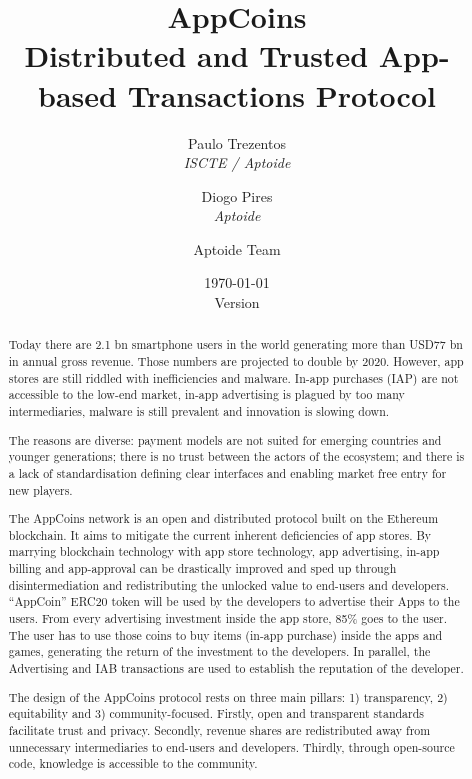 \documentclass[12pt, a4paper, titlepage]{article}
\title{AppCoins\\ Distributed and Trusted App-based Transactions Protocol}
\author{\small Paulo Trezentos  \\
  {\em  ISCTE / Aptoide}  \\
  \and 
\small  Diogo Pires \\
  {\em Aptoide} \\
  \and
  Aptoide Team
  }
\date{\today\\\normalsize Version \versionnumber}
\begin{document}
\maketitle


\begin{abstract}

Today there are 2.1 bn smartphone users in the world generating more than USD77 bn in annual gross revenue. Those numbers are projected to double by 2020. However, app stores are still riddled with inefficiencies and malware. In-app purchases (IAP) are not accessible to the low-end market, in-app advertising is plagued by too many intermediaries, malware is still prevalent and innovation is slowing down.

\medskip

The reasons are diverse: payment models are not suited for emerging countries and younger generations; there is no trust between the actors of the ecosystem; and there is a lack of standardisation defining clear interfaces and enabling market free entry for new players.

\medskip

The AppCoins network is an open and distributed protocol built on the Ethereum blockchain. It aims to mitigate the current inherent deficiencies of app stores. By marrying blockchain technology with app store technology, app advertising, in-app billing and app-approval can be drastically improved and sped up through disintermediation and redistributing the unlocked value to end-users and developers. ``AppCoin'' ERC20 token will be used by the developers to advertise their Apps to the users. From every advertising investment inside the app store, 85\% goes to the user. The user has to use those coins to buy items (in-app purchase) inside the apps and games, generating the return of the investment to the developers. In parallel, the Advertising and IAB transactions are used to establish the reputation of the developer.

\medskip

The design of the AppCoins protocol rests on three main pillars: 1) transparency, 2) equitability and 3) community-focused. Firstly, open and transparent standards facilitate trust and privacy. Secondly, revenue shares are redistributed away from unnecessary intermediaries to end-users and developers. Thirdly, through open-source code, knowledge is accessible to the community. 


\end{abstract}
\end{document}
